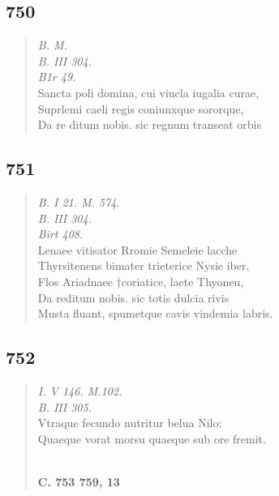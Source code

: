 \documentclass[11pt, a4paper]{report}
\begin{document}
            \subsection*{750}
      \begin{verse}
      \textit{B. M.} \\ \textit{B. III 304.} \\ \textit{B1r 49.} \\  \lbrack Sancta \rbrack  poli domina, cui viucla iugalia curae, \\  \lbrack Suprlemi caeli regis coniunxque sororque, \\  \lbrack Da re \rbrack ditum nobis. sic regnum transeat orbis \\ 
      \end{verse}
  
            \subsection*{751}
      \begin{verse}
      \textit{B. I 21. M. 574.} \\ \textit{B. III 304.} \\ \textit{Birt 408.} \\ Lenaee vitisator Rromie Semeleie lacche \\ Thyrsitenens bimater trieterice Nysie iber, \\ Flos Ariadnaee †coriatice, laete Thyoneu, \\ Da reditum nobis. sic totis dulcia rivis \\ Musta fluant, spumetque cavis vindemia labris. \\ 
      \end{verse}
  
            \subsection*{752}
      \begin{verse}
      \textit{I. V 146. M.102.} \\ \textit{B. III 305.} \\ Vtraque fecundo nutritur belua Nilo: \\ Quaeque vorat morsu quaeque sub ore fremit. \\ 
        ﻿\pagebreak 
     \marginpar{[234]} \begin{center} \textbf{C. 753 759, 13} \end{center}
      \end{verse}
  
\end{document}

